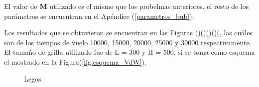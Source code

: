 El valor de $\mathbf{M}$ utilizado es el mismo que los probelmas anteriores, el resto de los parámetros se encuentran en el Apéndice (\ref{parametros_bub}).

Los resultados que se obtuvieron se encuentran en las Figuras ()()()()(, las cuáles son de los tiempos de vuelo 10000, 15000, 20000, 25000 y 30000 respectivamente. El tamaño de grilla utilizado fue de L = 300 y H = 500, si se toma como esquema el mostrado en la Figura(\ref{fig:esquema_VdW}).


\iffalse


\begin{figure}[htbp]
	\centering
	\hspace{10mm}
	\vspace{10mm}
	\hspace{10mm}
	\vspace{10mm}
	\caption{Legos.} \label{fig:lego}
\end{figure}

